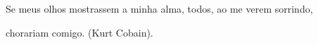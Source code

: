
\begin{epigrafe}
\vspace*{\fill}
\begin{flushleft}
\justify
\hspace{4cm} Se meus olhos mostrassem a minha
alma, todos, ao me verem sorrindo,

\hspace{3,4cm} chorariam comigo. (Kurt Cobain).
\end{flushleft}

\end{epigrafe}
